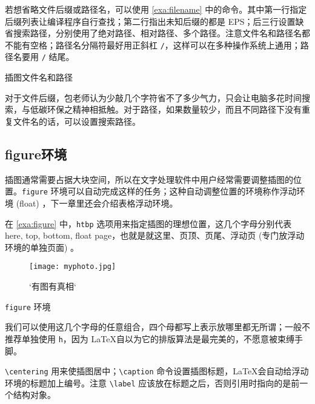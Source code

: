 若想省略文件后缀或路径名，可以使用 \autoref{exa:filename} 中的命令。其中第一行指定后缀列表让编译程序自行查找；第二行指出未知后缀的都是 EPS；后三行设置缺省搜索路径，分别使用了绝对路径、相对路径、多个路径。注意文件名和路径名都不能有空格；路径名分隔符最好用正斜杠 \verb|/|，这样可以在多种操作系统上通用；路径名要用 \verb|/| 结尾。

\begin{example}[h]
\begin{Code}[numbers=left]
\graphicspath{{c:/secret-garden/}}
\graphicspath{{./img/}}
\graphicspath{{one-little/}{two-little/}{three-little-indians/}}
\end{Code}
\caption{插图文件名和路径}
\label{exa:filename}
\end{example}

对于文件后缀，包老师认为少敲几个字符省不了多少气力，只会让电脑多花时间搜索，与低碳环保之精神相抵触。对于路径，如果数量较少，而且不同路径下没有重复文件名的话，可以设置搜索路径。

\subsection{figure环境}

插图通常需要占据大块空间，所以在文字处理软件中用户经常需要调整插图的位置。\texttt{figure} 环境可以自动完成这样的任务；这种自动调整位置的环境称作浮动环境 (float) ，下一章里还会介绍表格浮动环境。

在 \autoref{exa:figure} 中，\texttt{htbp} 选项用来指定插图的理想位置，这几个字母分别代表 here, top, bottom, float page，也就是就这里、页顶、页尾、浮动页 (专门放浮动环境的单独页面) 。

\begin{example}[h]
\begin{Code}[numbers=left]
\begin{figure}[htbp]
\centering
\texttt{[image: myphoto.jpg]}
\caption{`有图有真相`}
\label{fig:myphoto}
\end{figure}
\end{Code}
\caption{\texttt{figure} 环境}
\label{exa:figure}
\end{example}

我们可以使用这几个字母的任意组合，四个母都写上表示放哪里都无所谓；一般不推荐单独使用 \texttt{h}，因为 \LaTeX 自以为它的排版算法是最完美的，不愿意被束缚手脚。

\verb|\centering| 用来使插图居中；\verb|\caption| 命令设置插图标题，\LaTeX 会自动给浮动环境的标题加上编号。注意 \verb|\label| 应该放在标题之后，否则引用时指向的是前一个结构对象。

